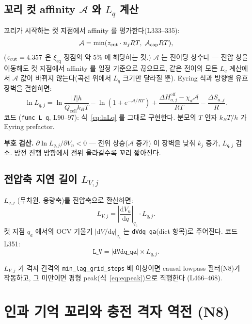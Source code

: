 \documentclass[11pt,a4paper]{article}
\newcommand{\dd}{\mathrm{d}}
\newcommand{\eff}{\mathrm{eff}}
\newcommand{\eq}{\mathrm{eq}}
\newcommand{\cell}{\mathrm{cell}}
\begin{document}
\subsection{꼬리 컷 affinity $\mathcal{A}$ 와 $L_q$ 계산}

꼬리가 시작하는 컷 지점에서 affinity 를 평가한다(L333--335):
\begin{equation}
\mathcal{A} = \min(z_{\rm cut}\cdot n_j RT,\; \mathcal{A}_{\rm cap} RT),
\label{eq:Acut}
\end{equation}
($z_{\rm cut}=4.357$ 은 $\xi_{\eq}$ 정점의 약 $5\%$ 에 해당하는 컷.) $\mathcal{A}$ 는 전이당 상수다 — 전압 창을 이동해도 컷 지점에서 affinity 를 일정 기준으로 끊으므로, 같은 전이의 모든 $L_q$ 계산에서 $\mathcal{A}$ 값이 바뀌지 않는다(곡선 위에서 $L_q$ 크기만 달라질 뿐). Eyring 식과 방향별
유효 장벽을 결합하면:
\begin{equation}
\ln L_{q,j} = \ln\frac{|I|h}{Q_\cell k_B T} - \ln\left(1+e^{-\mathcal{A}/RT}\right)
+ \frac{\Delta H_{a,j}^\eff - \chi_d\mathcal{A}}{RT} - \frac{\Delta S_{a,j}}{R}.
\label{eq:lnLq}
\end{equation}
코드 (\texttt{func\_L\_q}, L90--97):
식~\eqref{eq:lnLq} 를 그대로 구현한다. 분모의 $T$ 인자 $k_BT/h$ 가 Eyring prefactor.

\textbf{부호 검산.} $\partial\ln L_{q,j}/\partial V_n < 0$ — 전위 상승($\mathcal{A}$ 증가)
이 장벽을 낮춰 $k_j$ 증가, $L_{q,j}$ 감소. 방전 진행 방향에서 전위 올라갈수록 꼬리
짧아진다.

\subsection{전압축 지연 길이 $L_{V,j}$}

$L_{q,j}$ (무차원, 용량축)를 전압축으로 환산하면:
\begin{equation}
L_{V,j} = \left|\frac{\dd V_n}{\dd q}\right|_{q_a}\cdot L_{q,j}.
\label{eq:LV}
\end{equation}
컷 지점 $q_a$ 에서의 OCV 기울기 $|\dd V/\dd q|_{q_a}$ 는 \texttt{dVdq\_qa}(dict 항목)로
주어진다. 코드 L351:
\begin{equation*}
\texttt{L\_V} = |\texttt{dVdq\_qa}|\times L_{q,j}.
\end{equation*}

$L_{V,j}$ 가 격자 간격의 \texttt{min\_lag\_grid\_steps} 배 이상이면 causal lowpass
필터(N8)가 작동하고, 그 미만이면 평형 peak(식~\eqref{eq:eqpeak})으로 직행한다
(L466--468).

\section{인과 기억 꼬리와 충전 격자 역전 (N8)}\label{sec:tail}
\end{document}
